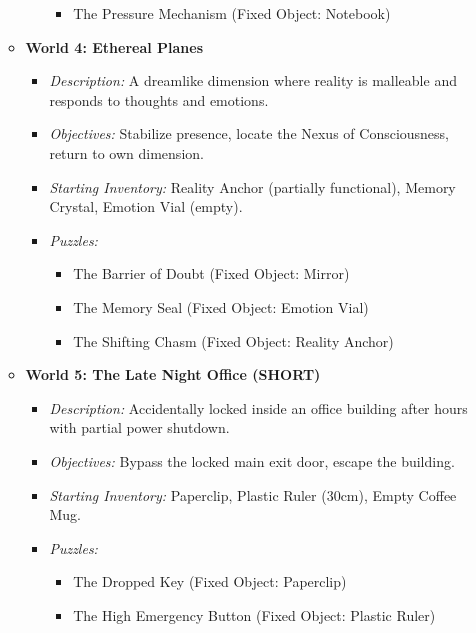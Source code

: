 \documentclass{article}
\begin{document}
\begin{itemize}
\begin{itemize}
\begin{itemize}
\begin{itemize}
                            \item The Pressure Mechanism (Fixed Object: Notebook)
                        \end{itemize}
                \end{itemize}
            \item \textbf{World 4: Ethereal Planes}
                \begin{itemize}
                    \item \textit{Description:} A dreamlike dimension where reality is malleable and responds to thoughts and emotions.
                    \item \textit{Objectives:} Stabilize presence, locate the Nexus of Consciousness, return to own dimension.
                    \item \textit{Starting Inventory:} Reality Anchor (partially functional), Memory Crystal, Emotion Vial (empty).
                    \item \textit{Puzzles:}
                        \begin{itemize}
                            \item The Barrier of Doubt (Fixed Object: Mirror)
                            \item The Memory Seal (Fixed Object: Emotion Vial)
                            \item The Shifting Chasm (Fixed Object: Reality Anchor)
                        \end{itemize}
                \end{itemize}
            \item \textbf{World 5: The Late Night Office (SHORT)}
                \begin{itemize}
                    \item \textit{Description:} Accidentally locked inside an office building after hours with partial power shutdown.
                    \item \textit{Objectives:} Bypass the locked main exit door, escape the building.
                    \item \textit{Starting Inventory:} Paperclip, Plastic Ruler (30cm), Empty Coffee Mug.
                    \item \textit{Puzzles:}
                        \begin{itemize}
                            \item The Dropped Key (Fixed Object: Paperclip)
                            \item The High Emergency Button (Fixed Object: Plastic Ruler)

\end{itemize}
\end{itemize}
\end{itemize}
\end{itemize}
\end{document}
